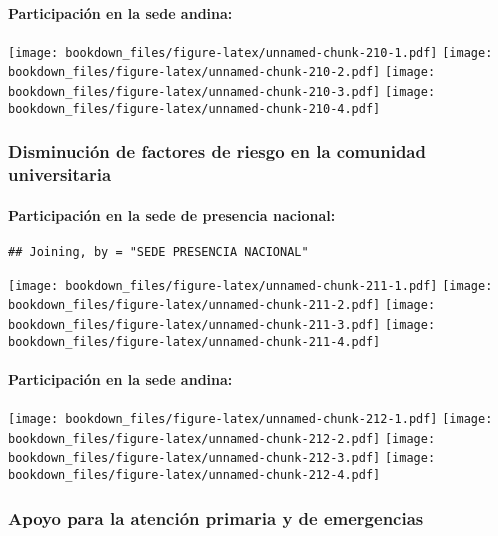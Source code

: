 \documentclass[]{article}
\let\oldparagraph\paragraph
\renewcommand{\paragraph}[1]{\oldparagraph{#1}\mbox{}}
\theoremstyle{definition}
\theoremstyle{definition}
\theoremstyle{definition}
\theoremstyle{remark}
\begin{document}
\paragraph{Participación en la sede
andina:}\label{participacion-en-la-sede-andina-17}

\texttt{[image: bookdown\_files/figure-latex/unnamed-chunk-210-1.pdf]}
\texttt{[image: bookdown\_files/figure-latex/unnamed-chunk-210-2.pdf]}
\texttt{[image: bookdown\_files/figure-latex/unnamed-chunk-210-3.pdf]}
\texttt{[image: bookdown\_files/figure-latex/unnamed-chunk-210-4.pdf]}

\subsubsection{Disminución de factores de riesgo en la comunidad
universitaria}\label{disminucion-de-factores-de-riesgo-en-la-comunidad-universitaria-1}

\paragraph{Participación en la sede de presencia
nacional:}\label{participacion-en-la-sede-de-presencia-nacional-18}

\begin{verbatim}
## Joining, by = "SEDE PRESENCIA NACIONAL"
\end{verbatim}

\texttt{[image: bookdown\_files/figure-latex/unnamed-chunk-211-1.pdf]}
\texttt{[image: bookdown\_files/figure-latex/unnamed-chunk-211-2.pdf]}
\texttt{[image: bookdown\_files/figure-latex/unnamed-chunk-211-3.pdf]}
\texttt{[image: bookdown\_files/figure-latex/unnamed-chunk-211-4.pdf]}

\paragraph{Participación en la sede
andina:}\label{participacion-en-la-sede-andina-18}

\texttt{[image: bookdown\_files/figure-latex/unnamed-chunk-212-1.pdf]}
\texttt{[image: bookdown\_files/figure-latex/unnamed-chunk-212-2.pdf]}
\texttt{[image: bookdown\_files/figure-latex/unnamed-chunk-212-3.pdf]}
\texttt{[image: bookdown\_files/figure-latex/unnamed-chunk-212-4.pdf]}

\subsubsection{Apoyo para la atención primaria y de
emergencias}\label{apoyo-para-la-atencion-primaria-y-de-emergencias-1}
\end{document}
